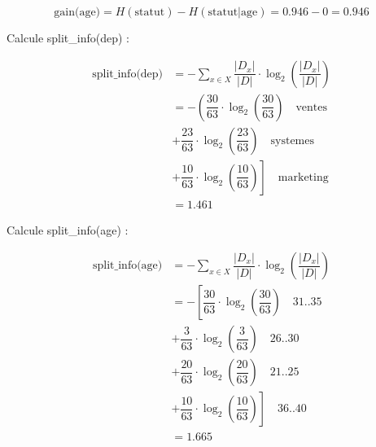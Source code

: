 \documentclass{article}
\begin{document}
\vspace{-0.15cm}

\[\text{gain(age)} = H(\text{statut}) - H(\text{statut} | \text{age}) = 0.946 - 0 = 0.946\]

\vspace{0.45cm}




\vspace{0.45cm}
Calcule split\_info(dep) :

\vspace{-0.5cm}

\begin{align*}
    \text{split\_info(dep)} &= - \sum_{x \in X} \dfrac{|D_x|}{|D|} \cdot \log_2\left( \dfrac{|D_x|}{|D|} \right) \\[0.25cm]
                            &= - \left( \dfrac{30}{63} \cdot  \log_2\left( \dfrac{30}{63} \right) \quad \text{ventes} \right. \\[0.25cm]
                            &+ \dfrac{23}{63} \cdot  \log_2\left( \dfrac{23}{63} \right) \quad \text{systemes} \\[0.25cm]
                            &+ \left. \dfrac{10}{63} \cdot  \log_2\left( \dfrac{10}{63} \right) \right]\quad \text{marketing} \\[0.25cm]
                            & = 1.461
\end{align*}

\vspace{0.45cm}
Calcule split\_info(age) :


\begin{align*}
    \text{split\_info(age)} &= - \sum_{x \in X} \dfrac{|D_x|}{|D|} \cdot \log_2\left( \dfrac{|D_x|}{|D|} \right) \\[0.25cm]
                            &= - \left[ \dfrac{30}{63} \cdot  \log_2\left( \dfrac{30}{63} \right) \quad \text{31..35} \right. \\[0.25cm]
                            &+ \dfrac{3}{63} \cdot  \log_2\left( \dfrac{3}{63} \right) \quad \text{26..30} \\[0.25cm]
                            &+ \dfrac{20}{63} \cdot  \log_2\left( \dfrac{20}{63} \right) \quad \text{21..25} \\[0.25cm]
                            &+ \left .\dfrac{10}{63} \cdot  \log_2\left( \dfrac{10}{63} \right) \right] \quad \text{36..40} \\[0.25cm]
                            & = 1.665
\end{align*}
\end{document}
